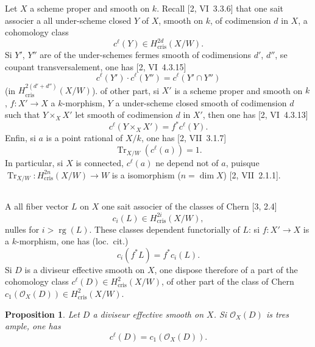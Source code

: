 \documentclass[12pt,a4paper]{article}
\theoremstyle{plain}
\newtheorem{proposition}[theorem]{Proposition}
\theoremstyle{definition}
\theoremstyle{remark}
\DeclareMathOperator{\Tr}{Tr}
\DeclareMathOperator{\rg}{rg}
\newcommand{\cris}{\mathrm{cris}}
\begin{document}
Let $X$ a scheme proper and smooth on $k$. Recall [2, VI~3.3.6] that one sait associer a all under-scheme closed $Y$ of $X$, smooth on $k$, of codimension $d$ in $X$, a cohomology class
\begin{equation}\label{eq:3.1.1}
c^{\ell}(Y) \in H^{2d}_{\cris}(X/W).
\end{equation}
Si $Y'$, $Y''$ are of the under-schemes fermes smooth of codimensions $d'$, $d''$, se coupant transversalement, one has [2, VI~4.3.15]
\begin{equation}\label{eq:3.1.2}
c^{\ell}(Y') \cdot c^{\ell}(Y'') = c^{\ell}(Y' \cap Y'')
\end{equation}
(in $H^{2(d'+d'')}_{\cris}(X/W)$). of other part, si $X'$ is a scheme proper and smooth on $k$, $f: X' \to X$ a $k$-morphism, $Y$ a under-scheme closed smooth of codimension $d$ such that $Y \times_X X'$ let smooth of codimension $d$ in $X'$, then one has [2, VI~4.3.13]
\begin{equation}\label{eq:3.1.3}
c^{\ell}(Y \times_X X') = f^* c^{\ell}(Y).
\end{equation}
Enfin, si $a$ is a point rational of $X/k$, one has [2, VII~3.1.7]
\begin{equation}\label{eq:3.1.4}
\Tr_{X/W}(c^{\ell}(a)) = 1.
\end{equation}
In particular, si $X$ is connected, $c^{\ell}(a)$ ne depend not of $a$, puisque $\Tr_{X/W}: H^{2n}_{\cris}(X/W) \to W$ is a isomorphism ($n = \dim X$) [2, VII~2.1.1].

\subsection{}

A all fiber vector $L$ on $X$ one sait associer of the classes of Chern [3, 2.4]
\begin{equation}\label{eq:3.2.1}
c_i(L) \in H^{2i}_{\cris}(X/W),
\end{equation}
nulles for $i > \rg(L)$. These classes dependent functorially of $L$: si $f: X' \to X$ is a $k$-morphism, one has (loc.~cit.)
\begin{equation}\label{eq:3.2.2}
c_i(f^* L) = f^* c_i(L).
\end{equation}
Si $D$ is a diviseur effective smooth on $X$, one dispose therefore of a part of the cohomology class $c^{\ell}(D) \in H^2_{\cris}(X/W)$, of other part of the class of Chern $c_1(\mathcal{O}_X(D)) \in H^2_{\cris}(X/W)$.

\begin{proposition}\label{prop:3.2.3}
Let $D$ a diviseur effective smooth on $X$. Si $\mathcal{O}_X(D)$ is tres ample, one has
\begin{equation}\label{eq:3.2.3.1}
c^{\ell}(D) = c_1(\mathcal{O}_X(D)).
\end{equation}
\end{proposition}
\end{document}
